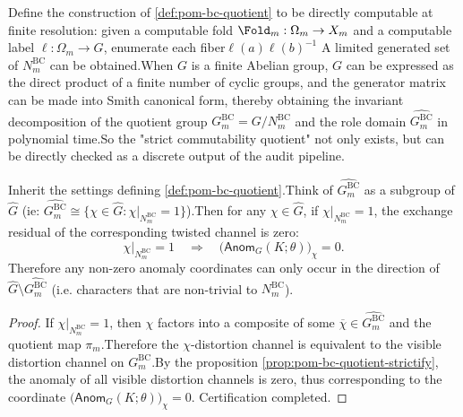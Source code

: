 \begin{remark}\label{rem:pom-bc-quotient-computable}Define the construction of \ref{def:pom-bc-quotient} to be directly computable at finite resolution: given a computable fold \(\Fold_m:\Omega_m\to X_m\) and a computable label \(\ell:\Omega_m\to G\), enumerate each fiber\(
\ell(a)\ell(b)^{-1}
\)
A limited generated set of \(N^{\mathrm{BC}}_m\) can be obtained.When \(G\) is a finite Abelian group, \(G\) can be expressed as the direct product of a finite number of cyclic groups, and the generator matrix can be made into Smith canonical form, thereby obtaining the invariant decomposition of the quotient group \(G^{\mathrm{BC}}_m=G/N^{\mathrm{BC}}_m\) and the role domain \(\widehat{G^{\mathrm{BC}}_m}\) in polynomial time.So the "strict commutability quotient" not only exists, but can be directly checked as a discrete output of the audit pipeline.\end{remark}

\begin{corollary}\label{cor:pom-anom-supported-on-bc-kernel}Inherit the settings defining \ref{def:pom-bc-quotient}.Think of \(\widehat{G^{\mathrm{BC}}_m}\) as a subgroup of \(\widehat G\) (ie: \(\widehat{G^{\mathrm{BC}}_m}\cong\{\chi\in\widehat G:\chi|_{N^{\mathrm{BC}}_m}=1\}\)).Then for any \(\chi\in\widehat G\), if \(\chi|_{N^{\mathrm{BC}}_m}=1\), the exchange residual of the corresponding twisted channel is zero:\[
\chi|_{N^{\mathrm{BC}}_m}=1
\quad\Longrightarrow\quad
\bigl(\mathsf{Anom}_G(K;\theta)\bigr)_{\chi}=0.
\]
Therefore any non-zero anomaly coordinates can only occur in the direction of \(\widehat G\setminus \widehat{G^{\mathrm{BC}}_m}\) (i.e. characters that are non-trivial to \(N^{\mathrm{BC}}_m\)).\end{corollary}
\begin{proof}
If \(\chi|_{N^{\mathrm{BC}}_m}=1\), then \(\chi\) factors into a composite of some \(\overline\chi\in\widehat{G^{\mathrm{BC}}_m}\) and the quotient map \(\pi_m\).Therefore the \(\chi\)-distortion channel is equivalent to the visible distortion channel on \(G^{\mathrm{BC}}_m\).By the proposition \ref{prop:pom-bc-quotient-strictify}, the anomaly of all visible distortion channels is zero, thus corresponding to the coordinate \(\bigl(\mathsf{Anom}_G(K;\theta)\bigr)_{\chi}=0\). Certification completed.\end{proof}

